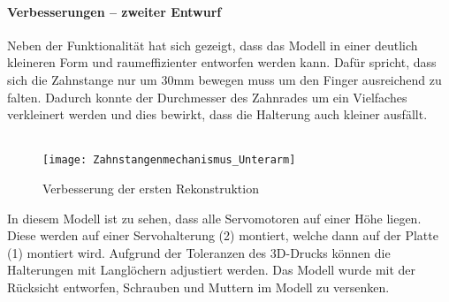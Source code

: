 \documentclass[titlepage,12pt,twoside]{article}
\begin{document}
\paragraph{Verbesserungen – zweiter Entwurf}
\hfill \break
\hfill \break
Neben der Funktionalität hat sich gezeigt, dass das Modell in einer deutlich kleineren Form und raumeffizienter entworfen werden kann. Dafür spricht, dass sich die Zahnstange nur um 30mm bewegen muss um den Finger ausreichend zu falten. 
Dadurch konnte der Durchmesser des Zahnrades um ein Vielfaches verkleinert werden und dies bewirkt, dass die Halterung auch kleiner ausfällt. \\
\\
\begin{figure}[H]
	\begin{center}
		\scalebox{1}
		{\texttt{[image: Zahnstangenmechanismus\_Unterarm]}}
		\caption{Verbesserung der ersten Rekonstruktion}
		\label{fig:Zahnstangenmechanismus_Unterarm}			
	\end{center}
\end{figure}
\hfill \break
In diesem Modell ist zu sehen, dass alle Servomotoren auf einer Höhe liegen. Diese werden auf einer Servohalterung (2) montiert, welche dann auf der Platte (1) montiert wird. Aufgrund der Toleranzen des 3D-Drucks können die Halterungen mit 
Langlöchern adjustiert werden. Das Modell wurde mit der Rücksicht entworfen, Schrauben und Muttern im Modell zu versenken. \\
\\
\newpage
\end{document}
